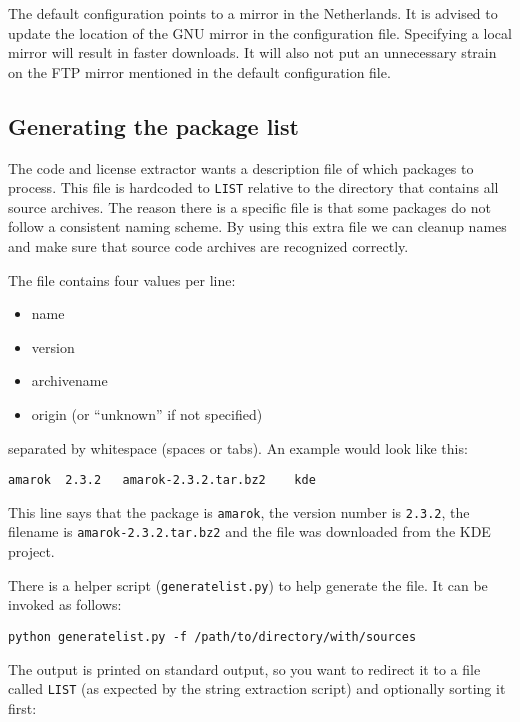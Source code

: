 \documentclass[10pt]{article}
\begin{document}
The default configuration points to a mirror in the Netherlands. It is advised
to update the location of the GNU mirror in the configuration file. Specifying
a local mirror will result in faster downloads. It will also not put an
unnecessary strain on the FTP mirror mentioned in the default configuration
file.

\subsection{Generating the package list}

The code and license extractor wants a description file of which packages to
process. This file is hardcoded to \texttt{LIST} relative to the directory that
contains all source archives. The reason there is a specific file is that some
packages do not follow a consistent naming scheme. By using this extra file we
can cleanup names and make sure that source code archives are recognized
correctly.

The file contains four values per line:

\begin{itemize}
\item name
\item version
\item archivename
\item origin (or ``unknown'' if not specified)
\end{itemize}

separated by whitespace (spaces or tabs). An example would look like this:

\begin{verbatim}
amarok	2.3.2	amarok-2.3.2.tar.bz2	kde
\end{verbatim}

This line says that the package is \texttt{amarok}, the version number is
\texttt{2.3.2}, the filename is \texttt{amarok-2.3.2.tar.bz2} and the file
was downloaded from the KDE project.

There is a helper script (\texttt{generatelist.py}) to help generate the file.
It can be invoked as follows:

\begin{verbatim}
python generatelist.py -f /path/to/directory/with/sources
\end{verbatim}

The output is printed on standard output, so you want to redirect it to a file
called \texttt{LIST} (as expected by the string extraction script) and
optionally sorting it first:
\end{document}
